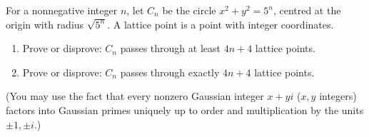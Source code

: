 For a nonnegative integer $n$, let $C_n$ be the circle $x^2+y^2=5^n$, centred at the origin with radius $\sqrt{5^n}$. A lattice point is a point with integer coordinates.
\begin{enumerate}
\item[(a)] Prove or disprove: $C_n$ passes through at least $4n+4$ lattice points.
\item[(b)] Prove or disprove: $C_n$ passes through exactly $4n+4$ lattice points.
\end{enumerate}
(You may use the fact that every nonzero Gaussian integer $x+yi$ ($x,y$ integers) factors into Gaussian primes uniquely up to order and multiplication by the units $\pm1,\pm i$.)
